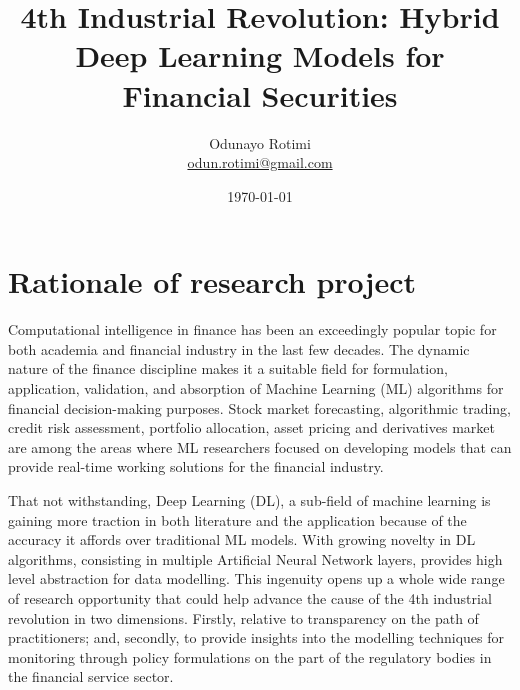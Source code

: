\documentclass[a4paper,11pt]{scrartcl}
\title{4th Industrial Revolution: Hybrid Deep Learning Models for Financial Securities}
\author{Odunayo Rotimi\\ \url{odun.rotimi@gmail.com}}
\date{\today}
\begin{document}
\maketitle


%
\section{Rationale of research project}
Computational intelligence in finance has been an exceedingly popular topic for both academia and financial industry in the last few decades. The dynamic nature of the finance discipline makes it a suitable field for formulation, application, validation, and absorption of Machine Learning (ML) algorithms for financial decision-making purposes. Stock market forecasting, algorithmic trading, credit risk assessment, portfolio allocation, asset pricing and derivatives market are among the areas where ML researchers focused on
developing models that can provide real-time working solutions for the financial industry. 
\newline

That not withstanding, Deep Learning (DL), a sub-field of machine learning is gaining more traction in both literature and the application because of the accuracy it affords over traditional ML models. With growing novelty in DL algorithms, consisting in multiple Artificial Neural Network layers, provides high level abstraction for data modelling. This ingenuity opens up a whole wide range of research opportunity that could help advance the cause of the 4th industrial revolution in two dimensions. Firstly, relative to transparency on the path of practitioners; and, secondly, to provide insights into the modelling techniques for monitoring through policy formulations on the part of the regulatory bodies in the financial service sector.


%
\end{document}
